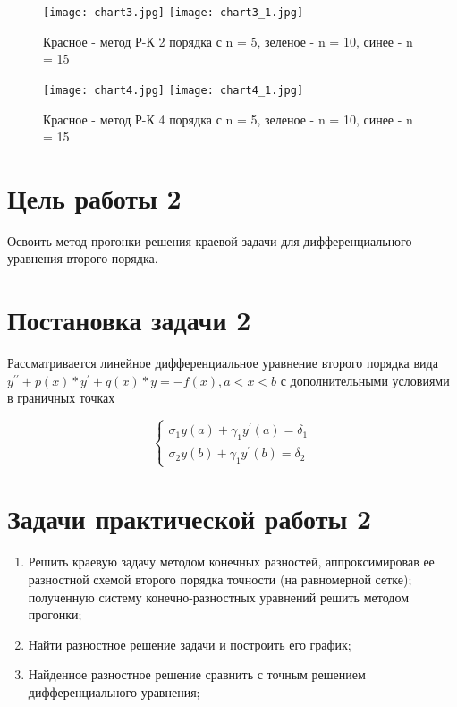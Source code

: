 \documentclass[a4paper,12pt,titlepage,finall]{article}
\begin{document}
\begin{figure}[h]
\centering
\texttt{[image: chart3.jpg]}
\texttt{[image: chart3\_1.jpg]}
\caption{Красное - метод Р-К 2 порядка с n = 5, зеленое - n = 10, синее - n = 15}
\end{figure}


\begin{figure}[h]
\centering
\texttt{[image: chart4.jpg]}
\texttt{[image: chart4\_1.jpg]}
\caption{Красное - метод Р-К 4 порядка с n = 5, зеленое - n = 10, синее - n = 15}
\end{figure}



\newpage
    

\newpage

\section{Цель работы 2}
Освоить метод прогонки решения краевой задачи для дифференциального
уравнения второго порядка.
\section{Постановка задачи 2}
Рассматривается линейное дифференциальное уравнение второго порядка вида
$y^{\prime\prime} + p(x)*y^{\prime}+q(x)*y=-f(x), a<x<b$
с дополнительными условиями в граничных точках

\begin{equation*}
 \begin{cases}
   {\sigma}_1 y(a) + {\gamma}_1 y^{\prime}(a) = {\delta}_1
   \\
   {\sigma_2} y(b) + {\gamma}_1 y^{\prime}(b) = {\delta}_2
 \end{cases}
\end{equation*}

\section{Задачи практической работы 2}
\begin{enumerate}
\item Решить краевую задачу методом конечных разностей, аппроксимировав ее разностной схемой второго порядка точности (на равномерной сетке); полученную систему конечно-разностных уравнений решить методом прогонки;
\item Найти разностное решение задачи и построить его график;
\item Найденное разностное решение сравнить с точным решением
дифференциального уравнения;
\end{enumerate}
\newpage
\end{document}
